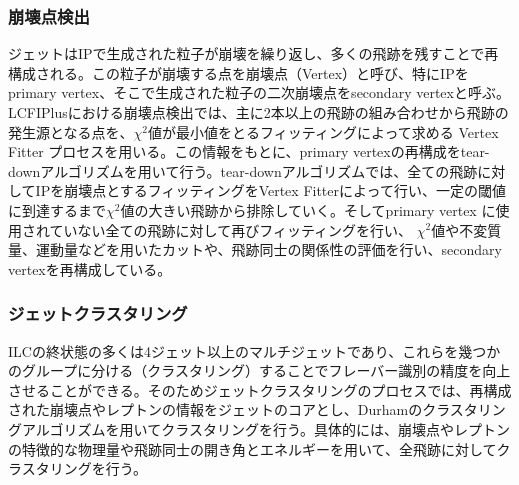 \subsubsection{崩壊点検出}
ジェットはIPで生成された粒子が崩壊を繰り返し、多くの飛跡を残すことで再構成される。この粒子が崩壊する点を崩壊点（Vertex）と呼び、特にIPをprimary vertex、そこで生成された粒子の二次崩壊点をsecondary vertexと呼ぶ。LCFIPlusにおける崩壊点検出では、主に2本以上の飛跡の組み合わせから飛跡の発生源となる点を、${\chi}^2$値が最小値をとるフィッティングによって求める Vertex Fitter プロセスを用いる。この情報をもとに、primary vertexの再構成をtear-downアルゴリズムを用いて行う。tear-downアルゴリズムでは、全ての飛跡に対してIPを崩壊点とするフィッティングをVertex Fitterによって行い、一定の閾値に到達するまで${\chi}^2$値の大きい飛跡から排除していく。そしてprimary vertex に使用されていない全ての飛跡に対して再びフィッティングを行い、 ${\chi}^2$値や不変質量、運動量などを用いたカットや、飛跡同士の関係性の評価を行い、secondary vertexを再構成している。

\subsubsection{ジェットクラスタリング}
ILCの終状態の多くは4ジェット以上のマルチジェットであり、これらを幾つかのグループに分ける（クラスタリング）することでフレーバー識別の精度を向上させることができる。そのためジェットクラスタリングのプロセスでは、再構成された崩壊点やレプトンの情報をジェットのコアとし、Durham\cite{durham}のクラスタリングアルゴリズムを用いてクラスタリングを行う。具体的には、崩壊点やレプトンの特徴的な物理量や飛跡同士の開き角とエネルギーを用いて、全飛跡に対してクラスタリングを行う。

